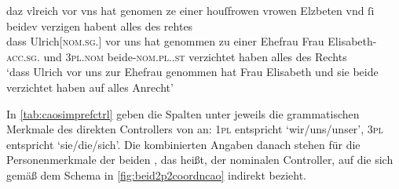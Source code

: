 \begin{exe}
\ex\label{ex:beid2p2coordncao}
	\gll daz vlreich \textelp{} vor vns hat genomen ze einer
		houſfrowen vrowen Elzbeten \textelp{} vnd ſi
		beidev \textelp{} verzigen habent \textelp{} alles des
		rehtes \\
		dass Ulrich[\textsc{nom.sg.\MascM}] {} vor uns hat genommen zu einer Ehefrau
		Frau Elisabeth-\textsc{acc.sg.\FemF} {} und \textsc{3pl\subMF{}.nom}
		beide-\textsc{nom.pl.\NeutMF.st} {} verzichtet haben {} alles des Rechts \\
		\trans `dass Ulrich \textelp{} vor uns zur Ehefrau
			genommen hat Frau Elisabeth \textelp{} und sie beide \textelp{}
			verzichtet haben auf alles Anrecht'
				\parencites(Nr.~2843, Salzburg, 1297)[175,22--25]{cao4}
\end{exe}

In \cref{tab:caosimprefctrl} geben die Spalten unter  jeweils
die grammatischen Merkmale des direkten Controllers von  an:
\textsc{1pl} entspricht `wir/uns/unser', \textsc{3pl} entspricht `sie/die/sich'.
Die kombinierten Angaben danach stehen für die Personen\-merkmale der beiden
, das heißt, der nominalen Controller, auf die sich
 gemäß dem Schema in \cref{fig:beid2p2coordncao} indirekt
bezieht.

